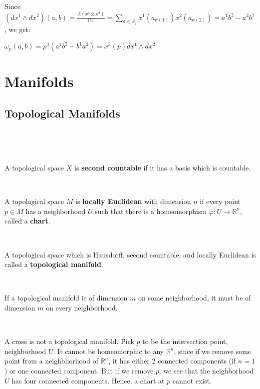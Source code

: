 \documentclass{article}
\begin{document}
\begin{solution}
  \

  Since $(dx^1 \wedge dx^2)(a,b) = \frac{A(x^1 \otimes x^2)}{1!1!} = \sum_{\sigma \in S_2} x^1(a_{\sigma(1)})x^2(a_{\sigma(2)}) = a^1b^2 - a^2b^1$, we get:

  $\omega_p(a,b) = p^3(a^1b^2 - b^1a^2) = x^3(p) dx^1 \wedge dx^2$
\end{solution}

\section{Manifolds}

\subsection{Topological Manifolds}
\

\begin{definition}
  \

  A topological space $X$ is \textbf{second countable} if it has a basis which is countable.
\end{definition}

\begin{definition}
  \

  A topological space $M$ is \textbf{locally Euclidean} with dimension $n$ if every point $p \in M$ has a neighborhood $U$ such that there is a homeomorphism $\varphi: U \to \mathbb{R}^n$, called a \textbf{chart}.
\end{definition}

\begin{definition}
  \

  A topological space which is Hausdorff, second countable, and locally Euclidean is called a \textbf{topological manifold}.
\end{definition}

\begin{proposition}
  \

  If a topological manifold is of dimension $m$ on some neighborhood, it must be of dimension $m$ on every neighborhood.
\end{proposition}

\begin{example}
  \

  A cross is not a topological manifold. Pick $p$ to be the intersection point, neighborhood $U$. It cannot be homeomorphic to any $\mathbb{R}^n$, since if we remove some point from a neighbhorhood of $\mathbb{R}^n$, it has either $2$ connected components (if $n=1$) or one connected component. But if we remove $p$, we see that the neighborhood $U$ has four connected components. Hence, a chart at $p$ cannot exist.
\end{example}
\end{document}
